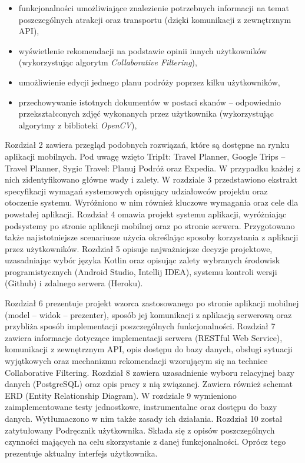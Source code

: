 \begin{itemize}

\item funkcjonalności umożliwiające znalezienie potrzebnych informacji na temat poszczególnych atrakcji oraz transportu (dzięki komunikacji z zewnętrznym API),

\item  wyświetlenie rekomendacji na podstawie opinii innych użytkowników (wykorzystując algorytm \textit{Collaborative Filtering}),

\item umożliwienie edycji jednego planu podróży poprzez kilku użytkowników,

\item przechowywanie istotnych dokumentów w postaci skanów – odpowiednio przekształconych zdjęć wykonanych przez użytkownika (wykorzystując algorytmy z biblioteki \textit{OpenCV}),

\end{itemize}

\par Rozdział 2 zawiera przegląd podobnych rozwiązań, które są dostępne na rynku aplikacji mobilnych. Pod uwagę wzięto TripIt: Travel Planner, Google Trips -- Travel Planner, Sygic Travel: Planuj Podróż oraz Expedia. W przypadku każdej z nich zidentyfikowano główne wady i zalety. W rozdziale 3 przedstawiono ekstrakt specyfikacji wymagań systemowych opisujący udziałowców projektu oraz otoczenie systemu. Wyróżniono w nim również kluczowe wymagania oraz cele dla powstałej aplikacji. Rozdział 4 omawia projekt systemu aplikacji, wyróżniając podsystemy po stronie aplikacji mobilnej oraz po stronie serwera. Przygotowano także najistotniejsze scenariusze użycia określając sposoby korzystania z aplikacji przez użytkowników. Rozdział 5 opisuje najważniejsze decyzje projektowe, uzasadniając wybór języka Kotlin oraz opisując zalety wybranych środowisk programistycznych (Android Studio, Intellij IDEA), systemu kontroli wersji (Github) i zdalnego serwera (Heroku). 

\par Rozdział 6 prezentuje projekt wzorca zastosowanego po stronie aplikacji mobilnej (model -- widok -- prezenter), sposób jej komunikacji z aplikacją serwerową oraz przybliża sposób implementacji poszczególnych funkcjonalności. Rozdział 7 zawiera informacje dotyczące implementacji serwera (RESTful Web Service), komunikacji z zewnętrznym API, opis dostępu do bazy danych, obsługi sytuacji wyjątkowych oraz mechanizmu rekomendacji wzorującym się na technice Collaborative Filtering. Rozdział 8 zawiera uzasadnienie wyboru relacyjnej bazy danych (PostgreSQL) oraz opis pracy z nią związanej. Zawiera również schemat ERD (Entity Relationship Diagram). W rozdziale 9 wymieniono zaimplementowane testy jednostkowe, instrumentalne oraz dostępu do bazy danych. Wytłumaczono w nim także zasady ich działania. Rozdział 10 został zatytułowany Podręcznik użytkownika. Składa się z opisów poszczególnych czynności mających na celu skorzystanie z danej funkcjonalności. Oprócz tego prezentuje aktualny interfejs użytkownika.

